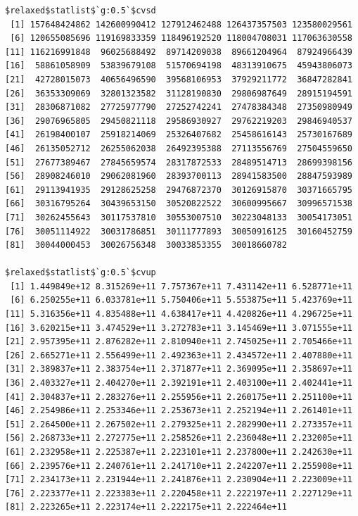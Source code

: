 \documentclass[
]{article}
\begin{document}
\begin{verbatim}
$relaxed$statlist$`g:0.5`$cvsd
 [1] 157648424862 142600990412 127912462488 126437357503 123580029561
 [6] 120655085696 119169833359 118496192520 118004708031 117063630558
[11] 116216991848  96025688492  89714209038  89661204964  87924966439
[16]  58861058909  53839679108  51570694198  48313910675  45943806073
[21]  42728015073  40656496590  39568106953  37929211772  36847282841
[26]  36353309069  32801323582  31128190830  29806987649  28915194591
[31]  28306871082  27725977790  27252742241  27478384348  27350980949
[36]  29076965805  29450821118  29586930927  29762219203  29846940537
[41]  26198400107  25918214069  25326407682  25458616143  25730167689
[46]  26135052712  26255062038  26492395388  27113556769  27504559650
[51]  27677389467  27845659574  28317872533  28489514713  28699398156
[56]  28908246010  29062081960  28393700113  28941583500  28847593989
[61]  29113941935  29128625258  29476872370  30126915870  30371665795
[66]  30316795264  30439653150  30520822522  30600995667  30996571538
[71]  30262455643  30117537810  30553007510  30223048133  30054173051
[76]  30051114922  30031786851  30111777893  30050916125  30160452759
[81]  30044000453  30026756348  30033853355  30018660782

$relaxed$statlist$`g:0.5`$cvup
 [1] 1.449849e+12 8.315269e+11 7.757367e+11 7.431142e+11 6.528771e+11
 [6] 6.250255e+11 6.033781e+11 5.750406e+11 5.553875e+11 5.423769e+11
[11] 5.316356e+11 4.835488e+11 4.638417e+11 4.420826e+11 4.296725e+11
[16] 3.620215e+11 3.474529e+11 3.272783e+11 3.145469e+11 3.071555e+11
[21] 2.957395e+11 2.876282e+11 2.810940e+11 2.745025e+11 2.705466e+11
[26] 2.665271e+11 2.556499e+11 2.492363e+11 2.434572e+11 2.407880e+11
[31] 2.389837e+11 2.383754e+11 2.371877e+11 2.369095e+11 2.358697e+11
[36] 2.403327e+11 2.404270e+11 2.392191e+11 2.403100e+11 2.402441e+11
[41] 2.304837e+11 2.283276e+11 2.255956e+11 2.260175e+11 2.251100e+11
[46] 2.254986e+11 2.253346e+11 2.253673e+11 2.252194e+11 2.261401e+11
[51] 2.264500e+11 2.267502e+11 2.279325e+11 2.282990e+11 2.273357e+11
[56] 2.268733e+11 2.272775e+11 2.258526e+11 2.236048e+11 2.232005e+11
[61] 2.232958e+11 2.225387e+11 2.223101e+11 2.237800e+11 2.242630e+11
[66] 2.239576e+11 2.240761e+11 2.241710e+11 2.242207e+11 2.255908e+11
[71] 2.234173e+11 2.231944e+11 2.241876e+11 2.230904e+11 2.223009e+11
[76] 2.223377e+11 2.223383e+11 2.220458e+11 2.222197e+11 2.227129e+11
[81] 2.223265e+11 2.223174e+11 2.222175e+11 2.222464e+11


\end{verbatim}
\end{document}
